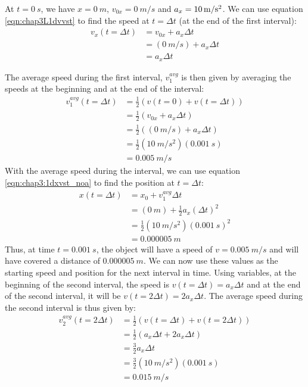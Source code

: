 At $t=\SI{0}{s}$, we have $x=\SI{0}{m}$, $v_{0x}=\SI{0}{m\per s}$ and $a_x=\SI{10}{m \per s\squared}$. We can use equation \ref{eqn:chap3L1dvvst} to find the speed at $t=\Delta t$ (at the end of the first interval):
\begin{align*}
v_x(t=\Delta t) &= v_{0x} + a_x\Delta t\\
&=(\SI{0}{m/s})+ a_x\Delta t\\&=a_x\Delta t
\end{align*}

The average speed during the first interval, $v_1^{avg}$ is then given by averaging the speeds at the beginning and at the end of the interval:
\begin{align*}
v_1^{avg}(t=\Delta t)&=\frac{1}{2}\left( v(t=0) + v(t=\Delta t)\right)\\
&=\frac{1}{2}\left(v_{0x}+a_x\Delta t\right)\\
&=\frac{1}{2}\left((\SI{0}{m/s})+a_x\Delta t\right)\\
&=\frac{1}{2}(\SI{10}{m/s^2})(\SI{0.001}{s})\\
&=\SI{0.005}{m/s}
\end{align*}
With the average speed during the interval, we can use equation \ref{eqn:chap3:1dxvst_noa} to find the position at $t=\Delta t$: 
\begin{align*}
x(t=\Delta t) &= x_0 +v_1^{avg}\Delta t\\
&=(\SI{0}{m}) + \frac{1}{2}a_x(\Delta t)^2\\
&= \frac{1}{2}(\SI{10}{m/s^2})(\SI{0.001}{s})^2\\
&=\SI{0.000005}{m}
\end{align*}
Thus, at time $t=\SI{0.001}{s}$, the object will have a speed of $v=\SI{0.005}{m/s}$ and will have covered a distance of $\SI{0.000005}{m}$. We can now use these values as the starting speed and position for the next interval in time. Using variables, at the beginning of the second interval, the speed is $v(t=\Delta t)=a_x\Delta t$ and at the end of the second interval, it will be $v(t=2\Delta t)=2a_x\Delta t$. The average speed during the second interval is thus given by:
\begin{align*}
v_2^{avg}(t=2\Delta t)&= \frac{1}{2}\left(v(t=\Delta t)+v(t=2\Delta t) \right)\\
&=\frac{1}{2}(a_x\Delta t+2a_x\Delta t)\\
&=\frac{3}{2}a_x\Delta t\\
&=\frac{3}{2}(\SI{10}{m/s^2})(\SI{0.001}{s})\\
&=\SI{0.015}{m/s}
\end{align*}
